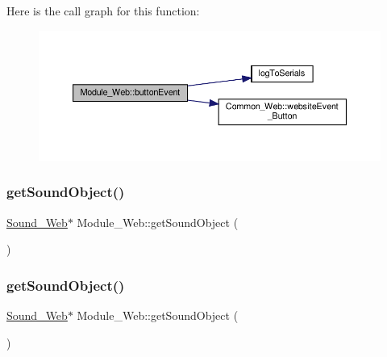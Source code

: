 Here is the call graph for this function\+:
\nopagebreak
\begin{figure}[H]
\begin{center}
\leavevmode
\includegraphics[width=350pt]{class_module___web_a522480d9045dd335a7679a7ab1c73b48_cgraph}
\end{center}
\end{figure}
\mbox{\label{class_module___web_a09662cbded5c21bb863ce53e082c2d79}} 
\subsubsection{\texorpdfstring{get\+Sound\+Object()}{getSoundObject()}\hspace{0.1cm}{\footnotesize\ttfamily [1/2]}}
{\footnotesize\ttfamily \hyperlink{class_sound___web}{Sound\+\_\+\+Web}$\ast$ Module\+\_\+\+Web\+::get\+Sound\+Object (\begin{DoxyParamCaption}{ }\end{DoxyParamCaption})}

\mbox{\label{class_module___web_a09662cbded5c21bb863ce53e082c2d79}} 
\subsubsection{\texorpdfstring{get\+Sound\+Object()}{getSoundObject()}\hspace{0.1cm}{\footnotesize\ttfamily [2/2]}}
{\footnotesize\ttfamily \hyperlink{class_sound___web}{Sound\+\_\+\+Web}$\ast$ Module\+\_\+\+Web\+::get\+Sound\+Object (\begin{DoxyParamCaption}{ }\end{DoxyParamCaption})}

